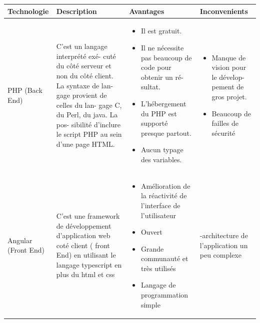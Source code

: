 \documentclass[11pt,a4paper,oneside]{book}
\begin{document}
	\begin{center}
		\begin{tabular}{ |p{2cm}|p{4cm}|p{4.4cm}|p{4.4cm}|  }
			\hline
			\vspace*{\fill}
			{\centering 
				Technologie\par
			}
			& \vspace*{\fill} {\centering
				Description\par
			} & \vspace*{\fill} {\centering
				Avantages\par
			}  & \vspace*{\fill} {\centering
				Inconvenients\par
			}\\ 
			\hline
			\vspace*{\fill}
			PHP (Back End) & \vspace*{\fill} C’est un langage interprété exé-
			cuté du côté serveur et non du
			côté client. La syntaxe de lan-
			gage provient de celles du lan-
			gage C, du Perl, du java. La pos-
			sibilité d’inclure le script PHP au
			sein d’une page HTML.
			& \vspace*{\fill} 
			\begin{itemize}
				\item Il est gratuit.
				\item Il ne nécessite pas
				beaucoup de code
				pour obtenir un ré-
				sultat.
				
				\item L’hébergement du
				PHP est supporté
				presque partout.
				
				\item Aucun typage des
				variables.
				
			\end{itemize}
			&  \vspace*{\fill}
			\begin{itemize}
				\item Manque de vision
				pour le dévelop-
				pement de gros
				projet.
				
				\item Beaucoup de failles
				de sécurité
			\end{itemize}
			\\ 
			\hline
			\vspace*{\fill}
			Angular (Front End) & \vspace*{\fill}
			C’est une framework de développement d’application web coté client ( front End) en utilisant le langage typescript en plus du html et css
			& \vspace*{\fill}
			\begin{itemize}
				\item Amélioration de la réactivité de l’interface de l’utilisateur 
				\item Ouvert 
				\item Grande communauté et très utilisés
				\item Langage de programmation simple
			\end{itemize}
			& \vspace*{\fill} -architecture de l’application un peu complexe\\ 
			\hline
			

\end{tabular}
\end{center}
\end{document}
